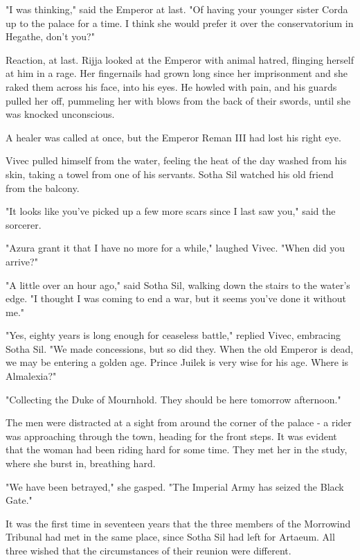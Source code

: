 "I was thinking," said the Emperor at last. "Of having your younger sister Corda up to the palace for a time. I think she would prefer it over the conservatorium in Hegathe, don't you?"

Reaction, at last. Rijja looked at the Emperor with animal hatred, flinging herself at him in a rage. Her fingernails had grown long since her imprisonment and she raked them across his face, into his eyes. He howled with pain, and his guards pulled her off, pummeling her with blows from the back of their swords, until she was knocked unconscious.

A healer was called at once, but the Emperor Reman III had lost his right eye.

Vivec pulled himself from the water, feeling the heat of the day washed from his skin, taking a towel from one of his servants. Sotha Sil watched his old friend from the balcony.

"It looks like you've picked up a few more scars since I last saw you," said the sorcerer.

"Azura grant it that I have no more for a while," laughed Vivec. "When did you arrive?"

"A little over an hour ago," said Sotha Sil, walking down the stairs to the water's edge. "I thought I was coming to end a war, but it seems you've done it without me."

"Yes, eighty years is long enough for ceaseless battle," replied Vivec, embracing Sotha Sil. "We made concessions, but so did they. When the old Emperor is dead, we may be entering a golden age. Prince Juilek is very wise for his age. Where is Almalexia?"

"Collecting the Duke of Mournhold. They should be here tomorrow afternoon."

The men were distracted at a sight from around the corner of the palace - a rider was approaching through the town, heading for the front steps. It was evident that the woman had been riding hard for some time. They met her in the study, where she burst in, breathing hard.

"We have been betrayed," she gasped. "The Imperial Army has seized the Black Gate."

It was the first time in seventeen years that the three members of the Morrowind Tribunal had met in the same place, since Sotha Sil had left for Artaeum. All three wished that the circumstances of their reunion were different.

